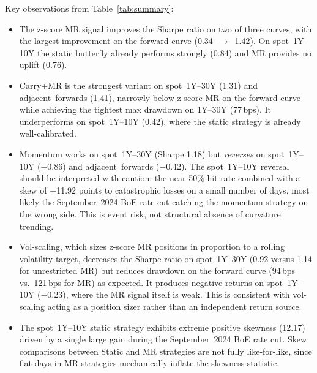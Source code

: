 \documentclass[11pt,a4paper]{article}
\begin{document}
Key observations from Table~\ref{tab:summary}:
\begin{itemize}
  \item The z-score MR signal improves the Sharpe ratio on two of three
        curves, with the largest improvement on the forward curve
        (0.34~$\to$~1.42).  On spot~1Y--10Y the static butterfly
        already performs strongly (0.84) and MR provides no uplift
        (0.76).
  \item Carry+MR is the strongest variant on spot~1Y--30Y (1.31) and
      adjacent~forwards (1.41), narrowly below z-score MR on the forward
        curve while achieving the tightest max drawdown on 1Y--30Y (77\,bps).  It
        underperforms on spot~1Y--10Y (0.42), where the static strategy
        is already well-calibrated.
  \item Momentum works on spot~1Y--30Y (Sharpe 1.18) but \emph{reverses}
      on spot~1Y--10Y ($-$0.86) and adjacent~forwards ($-$0.42).  The
        spot~1Y--10Y reversal should be interpreted with caution: the
        near-50\% hit rate combined with a skew of $-$11.92 points to
        catastrophic losses on a small number of days, most likely
        the September~2024 BoE rate cut catching the momentum strategy
        on the wrong side.  This is event risk, not structural absence
        of curvature trending.
  \item Vol-scaling, which sizes z-score MR positions in proportion to a
        rolling volatility target, decreases the Sharpe ratio on
        spot~1Y--30Y (0.92 versus 1.14 for unrestricted MR) but reduces
        drawdown on the forward curve (94\,bps vs.\ 121\,bps for MR) as expected. It
        produces negative returns on spot~1Y--10Y ($-$0.23), where the
        MR signal itself is weak.  This is consistent with vol-scaling
        acting as a position sizer rather than an independent return source.
  \item The spot~1Y--10Y static strategy exhibits extreme positive
        skewness (12.17) driven by a single large gain during the
        September~2024 BoE rate cut.  Skew comparisons between Static
        and MR strategies are not fully like-for-like, since flat days
        in MR strategies mechanically inflate the skewness statistic.
\end{itemize}
\end{document}
